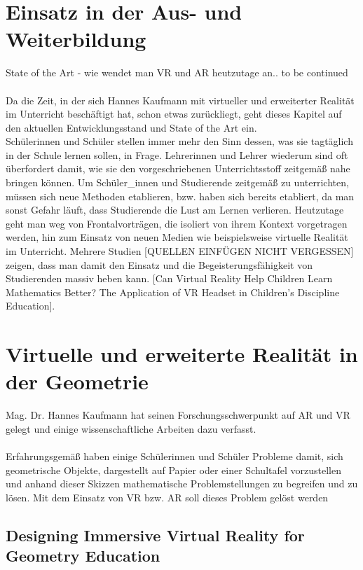 \documentclass[deutsch]{llncs}
\begin{document}
\section{Einsatz in der Aus- und Weiterbildung}
\label{sec:typo}
State of the Art - wie wendet man VR und AR heutzutage an.. to be continued \\
\noindent \\
Da die Zeit, in der sich Hannes Kaufmann mit virtueller und erweiterter Realität im Unterricht beschäftigt hat, schon etwas zurückliegt, geht dieses Kapitel auf den aktuellen Entwicklungsstand und State of the Art ein. \\
Schülerinnen und Schüler stellen immer mehr den Sinn dessen, was sie tagtäglich in der Schule lernen sollen, in Frage. Lehrerinnen und Lehrer wiederum sind oft überfordert damit, wie sie den vorgeschriebenen Unterrichtsstoff zeitgemäß nahe bringen können. Um Schüler\_innen und Studierende zeitgemäß zu unterrichten, müssen sich neue Methoden etablieren, bzw. haben sich bereits etabliert, da man sonst Gefahr läuft, dass Studierende die Lust am Lernen verlieren. Heutzutage geht man weg von Frontalvorträgen, die isoliert von ihrem Kontext vorgetragen werden, hin zum Einsatz von neuen Medien wie beispielsweise virtuelle Realität im Unterricht. Mehrere Studien [QUELLEN EINFÜGEN NICHT VERGESSEN] zeigen, dass man damit den Einsatz und die Begeisterungsfähigkeit von Studierenden massiv heben kann.
\cite{2}
[Can Virtual Reality Help Children Learn Mathematics Better? The Application of VR Headset in Children’s Discipline Education].


\section{Virtuelle und erweiterte Realität in der Geometrie}
Mag. Dr. Hannes Kaufmann hat seinen Forschungsschwerpunkt auf AR und VR gelegt und einige wissenschaftliche Arbeiten dazu verfasst. \\
\noindent \\
Erfahrungsgemäß haben einige Schülerinnen und Schüler Probleme damit, sich geometrische Objekte, dargestellt auf Papier oder einer Schultafel vorzustellen und anhand dieser Skizzen mathematische Problemstellungen zu begreifen und zu lösen. Mit dem Einsatz von VR bzw. AR soll dieses Problem gelöst werden

\label{sec:typo}

\subsection{Designing Immersive Virtual Reality for Geometry Education}
\label{subsec:}
\end{document}
